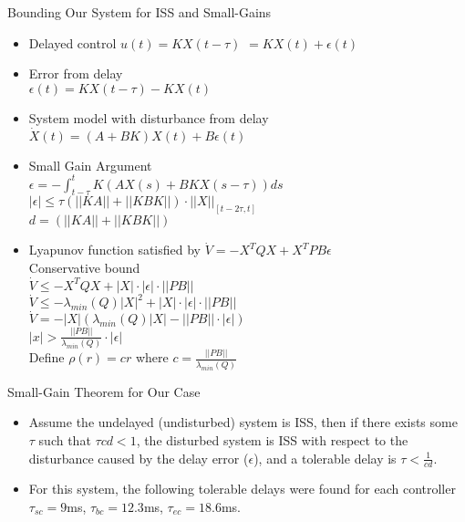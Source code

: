 \documentclass{beamer}
\begin{document}
\begin{frame}{Bounding Our System for ISS and Small-Gains}

\begin{itemize}

\item Delayed control $u\left(t\right)=KX\left(t-\tau\right)$ \pause$=KX\left(t\right)+\epsilon\left(t\right)$
\pause \item Error from delay \\ $\epsilon\left(t\right)=KX\left(t-\tau\right)-KX\left(t\right)$
\pause \item System model with disturbance from delay \\ $\dot{X}\left(t\right)=\left(A+BK\right)X\left(t\right)+B\epsilon\left(t\right)$
\pause \item Small Gain Argument\\$\epsilon=-\int^{t}_{t-\tau}K\left(AX\left(s\right)+BKX\left(s-\tau\right)\right)ds$
\pause \\ $|\epsilon|\leq\tau\left(||KA||+||KBK||\right)\cdot||X||_{\left[t-2\tau,t\right]}$
\pause \\ $d=(||KA||+||KBK||)$
\pause \item Lyapunov function satisfied by $\dot{V}=-X^TQX+X^TPB\epsilon$
\pause \\ Conservative bound \\ $\dot{V}\leq-X^TQX+|X|\cdot|\epsilon|\cdot||PB||$
\pause \\ $\dot{V}\leq-\lambda_{min}\left(Q\right)|X|^2+|X|\cdot|\epsilon|\cdot||PB||$
\pause \\ $\dot{V}=-|X|\left(\lambda_{min}\left(Q\right)|X|-||PB||\cdot|\epsilon|\right)$
\pause \\ $|x|>\frac{||PB||}{\lambda_{min}\left(Q\right)}\cdot|\epsilon|$
\pause \\ Define $\rho\left(r\right)=cr$ where $c=\frac{||PB||}{\lambda_{min}\left(Q\right)}$
\end{itemize}

\end{frame}

\begin{frame}{Small-Gain Theorem for Our Case}

\begin{itemize}
\item Assume the undelayed (undisturbed) system is ISS, then if there exists some $\tau$ such that $\tau cd<1$, \pause the disturbed system is ISS with respect to the disturbance caused by the delay error ($\epsilon$), and a tolerable delay is $\tau<\frac{1}{cd}$.
\pause \item For this system, the following tolerable delays were found for each controller $\tau_{sc}=9$ms, $\tau_{bc}=12.3$ms, $\tau_{ec}=18.6$ms.
\end{itemize}

\end{frame}
\end{document}
